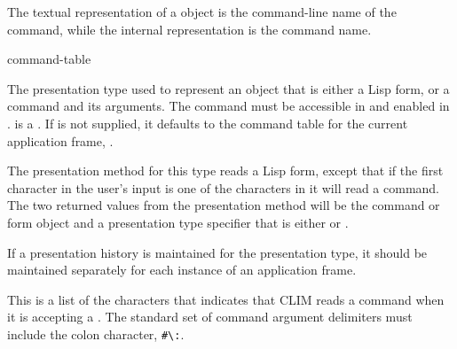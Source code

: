 The textual representation of a  object is the command-line
name of the command, while the internal representation is the command name.

 {\key command-table}

The presentation type used to represent an object that is either a Lisp form, or
a command and its arguments.  The command must be accessible in
 and enabled in .  
is a .  If  is not supplied, it
defaults to the command table for the current application frame,
.

The  presentation method for this type reads a Lisp form, except that
if the first character in the user's input is one of the characters in
 it will read a command.  The two returned values from
the  presentation method will be the command or form object and a
presentation type specifier that is either  or .

If a presentation history is maintained for the 
presentation type, it should be maintained separately for each instance of an
application frame.


This is a list of the characters that indicates that CLIM reads a command when
it is accepting a .  The standard set of command argument
delimiters must include the colon character, \verb+#\:+.
